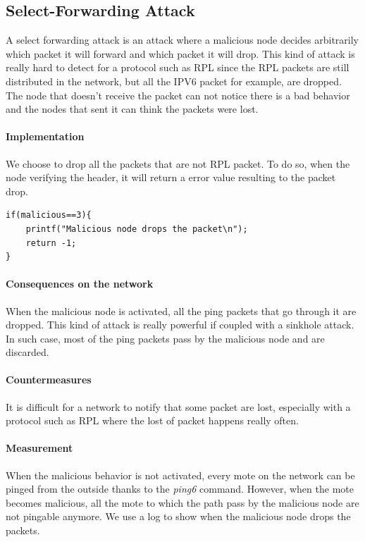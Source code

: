 \documentclass{report}
\begin{document}
\subsection{Select-Forwarding Attack}

A select forwarding attack is an attack where a malicious node decides
arbitrarily which packet it will forward and which packet it will drop.
This kind of attack is really hard to detect for a protocol such as
\textsc{RPL} since the \textsc{RPL} packets are still distributed in the
network, but all the IPV6 packet for example, are dropped. The node that
doesn't receive the packet can not notice there is a bad behavior and
the nodes that sent it can think the packets were lost. 


\paragraph{Implementation}
We choose to drop all the packets that are not \textsc{RPL} packet.
To do so, when the node verifying the header, it will return a error
value resulting to the packet drop.


\begin{lstlisting}[caption={Selective-forwarding attack done in the
rpl-ext-header.c file in the method rpl\_verify\_header}]
if(malicious==3){
	printf("Malicious node drops the packet\n");
	return -1;
}	
\end{lstlisting}

\paragraph{Consequences on the network}
When the malicious node is activated, all the ping packets that go
through it are dropped. This kind of attack is really powerful if
coupled with a sinkhole attack. In such case, most of the ping packets
pass by the malicious node and are discarded. 

\paragraph{Countermeasures}
It is difficult for a network to notify that some packet are lost,
especially with a protocol such as \textsc{RPL} where the lost of packet happens
really often. 

\paragraph{Measurement}
When the malicious behavior is not activated, every mote on the network
can be pinged from the outside thanks to the \textit{ping6} command.
However, when the mote becomes malicious, all the mote to which the path
pass by the malicious node are not pingable anymore. We use a log
to show when the malicious node drops the packets.
\end{document}
